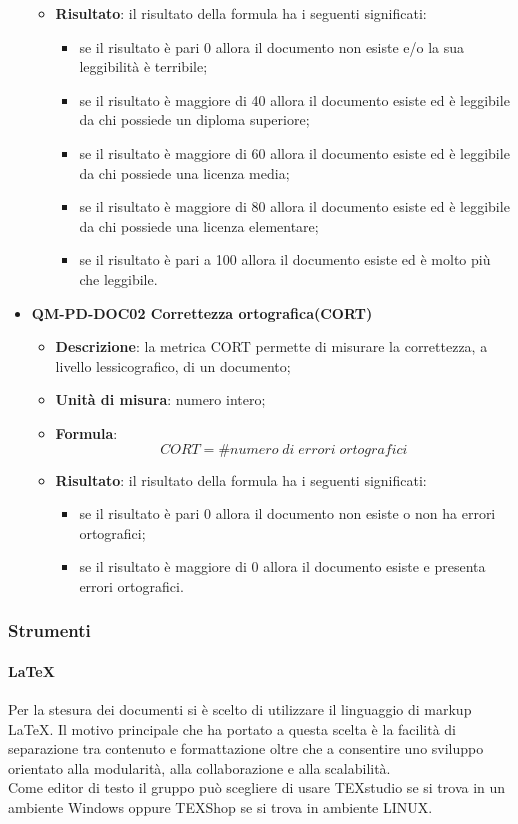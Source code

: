 \begin{itemize}
\begin{itemize}
							\item\textbf{Risultato}: il risultato della formula ha i seguenti significati:
								\begin{itemize}
									\item se il risultato è pari 0 allora il documento non esiste e/o la sua leggibilità è terribile;
									\item se il risultato è maggiore di 40 allora il documento esiste ed è leggibile da chi possiede un diploma superiore;
									\item se il risultato è maggiore di 60 allora il documento esiste ed è leggibile da chi possiede una licenza media;
									\item se il risultato è maggiore di 80 allora il documento esiste ed è leggibile da chi possiede una licenza elementare;
									\item se il risultato è pari a 100 allora il documento esiste ed è molto più che leggibile.
								\end{itemize}
						\end{itemize}
					\item\textbf{QM-PD-DOC02 Correttezza ortografica(CORT)} 
						\begin{itemize}
							\item\textbf{Descrizione}: la metrica CORT permette di misurare la correttezza, a livello lessicografico, di un documento;
							\item\textbf{Unità di misura}: numero intero;
							\item\textbf{Formula}: \\
								\[CORT = \# \mathit{numero\;di\;errori\;ortografici}\]
							\item\textbf{Risultato}: il risultato della formula ha i seguenti significati:
								\begin{itemize}
									\item se il risultato è pari 0 allora il documento non esiste o non ha errori ortografici;
									\item se il risultato è maggiore di 0 allora il documento esiste e presenta errori ortografici.
								\end{itemize}
						\end{itemize}
				\end{itemize}
		\subsubsection{Strumenti}
			\paragraph{LaTeX}
				Per la stesura dei documenti si è scelto di utilizzare il linguaggio di markup LaTeX. Il motivo principale che ha portato a questa scelta è la facilità di separazione tra contenuto e formattazione oltre che a consentire uno sviluppo orientato alla modularità, alla collaborazione e alla scalabilità.\\
				Come editor di testo il gruppo può scegliere di usare TEXstudio se si trova in un ambiente Windows oppure TEXShop se si trova in ambiente LINUX.  \\
